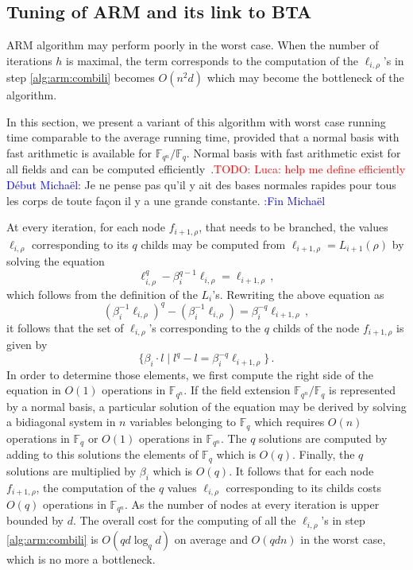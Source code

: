 \documentclass{sig-alternate}
\newcommand{\ff}[1]{\mathbb{F}_{#1}}
\newcommand{\dd}{d}
\newcommand{\qq}{q}
\newcommand{\nn}{n}
\newcommand{\qn}{{\qq^\nn}}
\newcommand{\basef}{\ff{\qq}}
\newcommand{\extf}{\ff{\qn}}
\newcommand{\bigO}{O}
\newcounter{algo}
\newcommand{\todo}[1]{\textcolor{red}{TODO: #1}}
\newcommand{\comd}{\noindent \textcolor{blue}{D\'ebut Micha\"el}:}
\newcommand{\comf}{\noindent \textcolor{blue}{:Fin Micha\"el}}
\begin{document}
\subsection{Tuning of ARM and its link to BTA}
 
 
 \medskip
 
 ARM algorithm may perform poorly in the worst case. When the number of iterations $h$ is maximal, 
the term corresponds to the computation of the $\ell_{i,\rho}$'s in step \ref{alg:arm:combili} becomes $\bigO(\nn^2 \dd)$ which may become the bottleneck of the algorithm. 

In this section, we present a variant of this algorithm with worst case running time comparable to the average running time, provided that a normal basis with fast arithmetic is available for $\extf/\basef$. 
Normal basis with fast arithmetic exist for all fields and can be computed efficiently~\cite{Couveignes-Lercier}.\todo{Luca: help me define efficiently}
\comd
Je ne pense pas qu'il y ait des bases normales rapides pour tous les corps de toute fa\c{c}on il y a une grande constante. 
\comf

At every iteration, for each node $f_{i+1,\rho}$, that needs to be branched, the values $\ell_{i,\rho}$ corresponding to its $\qq$ childs may be computed from $\ell_{i+1,\rho}=L_{i+1}(\rho)$ by solving the equation  
$$\ell_{i,\rho}^q-\beta_i^{\qq-1} \ell_{i,\rho}=\ell_{i+1,\rho}\,,$$
which follows from the definition of the $L_i$'s. Rewriting the above equation as 
$$(\beta_i^{-1}\ell_{i,\rho})^q-(\beta_i^{-1}\ell_{i,\rho})=\beta_i^{-q}\ell_{i+1,\rho}\,,$$
it follows that the set of $\ell_{i,\rho}$'s corresponding to the $\qq$ childs of the node $f_{i+1,\rho}$ is given by 
$$\{ \beta_i \cdot l \mid l^q-l=\beta_i^{-q}\ell_{i+1,\rho} \} \,.$$
In order to determine those elements, we first compute the right side of the equation in $O(1)$ operations in $\extf$. If the field extension $\extf/\basef$ is represented by a normal basis, a particular solution of the equation may be derived by solving a bidiagonal system in $n$ variables belonging to $\basef$ which requires $\bigO(\nn)$ operations in $\basef$ or $O(1)$ operations in $\extf$. The $\qq$ solutions are computed by adding to this solutions the elements of $\basef$ which is $\bigO(\qq)$.    Finally, the $\qq$ solutions are multiplied by $\beta_i$ which is $\bigO(q)$. It follows that for each node $f_{i+1,\rho}$, the computation of the $\qq$ values $\ell_{i,\rho}$ corresponding to its childs costs $\bigO(q)$ operations in $\extf$. As the number of nodes at every iteration is upper bounded by $\dd$. The overall cost for the computing of all the $\ell_{i,\rho}$'s in step \ref{alg:arm:combili}  is $O(\qq \dd \log_\qq \dd)$ on average and $O(\qq \dd \nn)$ in the worst case, which is no more a bottleneck.
\end{document}
